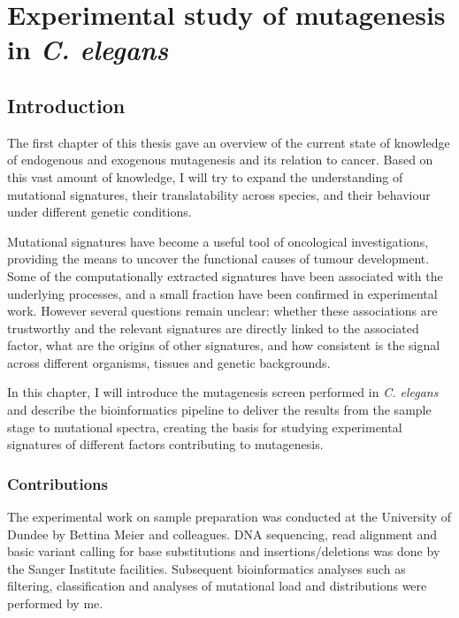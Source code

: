 

\pagestyle{empty}
\chapter{Experimental study of mutagenesis in \textit{C. elegans}}

\section{Introduction}

The first chapter of this thesis gave an overview of the 
current state of knowledge of endogenous and exogenous mutagenesis and 
its relation to cancer. Based on this vast amount of knowledge, I will 
try to expand the understanding of mutational signatures, their translatability 
across species, and their behaviour under different genetic conditions.

Mutational signatures have become a useful tool 
of oncological investigations, providing the means to uncover the functional causes 
of tumour development. Some of the computationally extracted 
signatures have been associated with the underlying processes, and a 
small fraction have been confirmed in experimental work. However several questions 
remain unclear: whether these associations are trustworthy and the relevant signatures 
are directly linked to the associated factor, what are the origins of other signatures, 
and how consistent is the signal across different organisms, tissues and genetic backgrounds.

In this chapter, I will introduce the mutagenesis screen performed
in \textit{C. elegans} and describe the bioinformatics pipeline to deliver 
the results from the sample stage to mutational spectra, creating the basis
for studying experimental signatures of different factors contributing
to mutagenesis.


\subsection*{Contributions}

The experimental work on sample preparation was conducted at the University of Dundee by 
Bettina Meier and colleagues. DNA sequencing, read alignment and basic variant calling for 
base substitutions and insertions/deletions was done by the Sanger Institute facilities. 
Subsequent bioinformatics analyses such as filtering, classification and analyses of mutational 
load and distributions were performed by me.

